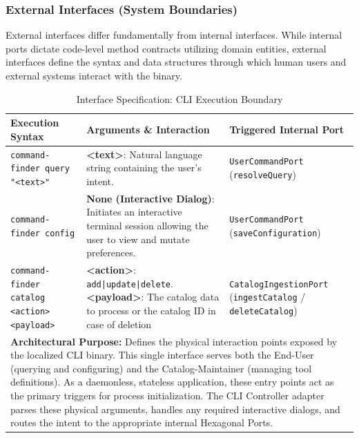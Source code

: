\subsubsection{External Interfaces (System Boundaries)}
\label{sec:external_interfaces}

External interfaces differ fundamentally from internal interfaces. While internal ports dictate code-level method contracts utilizing domain entities, external interfaces define the syntax and data structures through which human users and external systems interact with the binary. 

\begin{table}[htbp]
    \centering
    \caption{Interface Specification: CLI Execution Boundary}
    \label{tab:cli_execution_boundary}
    \renewcommand{\arraystretch}{1.4}
    \begin{tabularx}{\textwidth}{|p{4cm}|X|p{4.5cm}|}
        \hline
        \rowcolor{gray!10}
        \textbf{Execution Syntax} & \textbf{Arguments \& Interaction} & \textbf{Triggered Internal Port} \\
        \hline
        \texttt{command-finder query} \newline \texttt{"<text>"} & \textbf{<text>}: Natural language string containing the user's intent. & \texttt{UserCommandPort} \newline (\texttt{resolveQuery}) \\
        \hline
        \texttt{command-finder config} & \textbf{None (Interactive Dialog)}: Initiates an interactive terminal session allowing the user to view and mutate preferences. & \texttt{UserCommandPort} \newline (\texttt{saveConfiguration}) \\
        \hline
        \texttt{command-finder catalog} \newline \texttt{<action> <payload>} & \textbf{<action>}: \texttt{add|update|delete}. \newline \textbf{<payload>}: The catalog data to process or the catalog ID in case of deletion & \texttt{CatalogIngestionPort} \newline (\texttt{ingestCatalog} / \texttt{deleteCatalog}) \\
        \hline
        \multicolumn{3}{|p{\dimexpr\textwidth-2\tabcolsep-2\arrayrulewidth\relax}|}{
            \small \textbf{Architectural Purpose:} Defines the physical interaction points exposed by the localized \ac{CLI} binary. This single interface serves both the End-User (querying and configuring) and the Catalog-Maintainer (managing tool definitions). As a daemonless, stateless application, these entry points act as the primary triggers for process initialization. The \ac{CLI} Controller adapter parses these physical arguments, handles any required interactive dialogs, and routes the intent to the appropriate internal Hexagonal Ports.
        } \\
        \hline
    \end{tabularx}
\end{table}
\FloatBarrier


